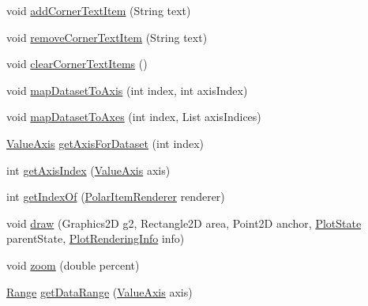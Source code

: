 \begin{DoxyCompactItemize}
\item 
void \mbox{\hyperlink{classorg_1_1jfree_1_1chart_1_1plot_1_1_polar_plot_a48f5b157d2780b828d04d10b6b8d9191}{add\+Corner\+Text\+Item}} (String text)
\item 
void \mbox{\hyperlink{classorg_1_1jfree_1_1chart_1_1plot_1_1_polar_plot_afc5eb6abe8def313fb7bf1694134c0ac}{remove\+Corner\+Text\+Item}} (String text)
\item 
void \mbox{\hyperlink{classorg_1_1jfree_1_1chart_1_1plot_1_1_polar_plot_ac9867e6b9be35d3b058d5d2b0e44de78}{clear\+Corner\+Text\+Items}} ()
\item 
void \mbox{\hyperlink{classorg_1_1jfree_1_1chart_1_1plot_1_1_polar_plot_ac599a0a775d458e5351f3fdc12f5f963}{map\+Dataset\+To\+Axis}} (int index, int axis\+Index)
\item 
void \mbox{\hyperlink{classorg_1_1jfree_1_1chart_1_1plot_1_1_polar_plot_a68cd9159d58a112b65f1164be6b2c8cf}{map\+Dataset\+To\+Axes}} (int index, List axis\+Indices)
\item 
\mbox{\hyperlink{classorg_1_1jfree_1_1chart_1_1axis_1_1_value_axis}{Value\+Axis}} \mbox{\hyperlink{classorg_1_1jfree_1_1chart_1_1plot_1_1_polar_plot_a1554ddd2ba4a53039cbf1cd389f5bfe2}{get\+Axis\+For\+Dataset}} (int index)
\item 
int \mbox{\hyperlink{classorg_1_1jfree_1_1chart_1_1plot_1_1_polar_plot_a8aa582abdd297b61c3e3f0df52fd2591}{get\+Axis\+Index}} (\mbox{\hyperlink{classorg_1_1jfree_1_1chart_1_1axis_1_1_value_axis}{Value\+Axis}} axis)
\item 
int \mbox{\hyperlink{classorg_1_1jfree_1_1chart_1_1plot_1_1_polar_plot_a906821dc15f43c7cbbed2bd3e91dcee7}{get\+Index\+Of}} (\mbox{\hyperlink{interfaceorg_1_1jfree_1_1chart_1_1renderer_1_1_polar_item_renderer}{Polar\+Item\+Renderer}} renderer)
\item 
void \mbox{\hyperlink{classorg_1_1jfree_1_1chart_1_1plot_1_1_polar_plot_a260ecaf3b71bceb0a45da065c1202f37}{draw}} (Graphics2D g2, Rectangle2D area, Point2D anchor, \mbox{\hyperlink{classorg_1_1jfree_1_1chart_1_1plot_1_1_plot_state}{Plot\+State}} parent\+State, \mbox{\hyperlink{classorg_1_1jfree_1_1chart_1_1plot_1_1_plot_rendering_info}{Plot\+Rendering\+Info}} info)
\item 
void \mbox{\hyperlink{classorg_1_1jfree_1_1chart_1_1plot_1_1_polar_plot_a6ca3780d2508a985a749fad66c2a1e58}{zoom}} (double percent)
\item 
\mbox{\hyperlink{classorg_1_1jfree_1_1data_1_1_range}{Range}} \mbox{\hyperlink{classorg_1_1jfree_1_1chart_1_1plot_1_1_polar_plot_ae99b116f3485ce4f6ad153f75153eee3}{get\+Data\+Range}} (\mbox{\hyperlink{classorg_1_1jfree_1_1chart_1_1axis_1_1_value_axis}{Value\+Axis}} axis)

\end{DoxyCompactItemize}
